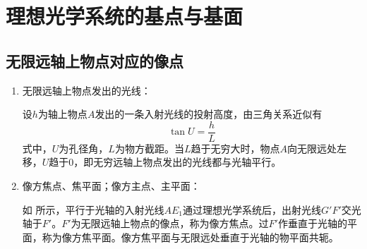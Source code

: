 \documentclass[cn,10pt,chinesefont=founder,math=newtx,cite=super,twoside]{elegantbook}
\begin{document}
\section{理想光学系统的基点与基面}
\subsection{无限远轴上物点对应的像点}
\label{subsect:infty-object}

\begin{enumerate}	
	\item 无限远轴上物点发出的光线：
	
	设$h$为轴上物点$A$发出的一条入射光线的投射高度，由三角关系近似有
	\begin{equation}
		\tan U=\frac{h}{L}
	\end{equation}
	式中，$U$为孔径角，$L$为物方截距。当$L$趋于无穷大时，物点$A$向无限远处左移，$U$趋于$0$，即无穷远轴上物点发出的光线都与光轴平行。
	\item 像方焦点、焦平面；像方主点、主平面：
	
	如 所示，平行于光轴的入射光线$AE_1$通过理想光学系统后，出射光线$G'F'$交光轴于$F'$。$F'$为无限远轴上物点的像点，称为像方焦点。过$F'$作垂直于光轴的平面，称为像方焦平面。像方焦平面与无限远处垂直于光轴的物平面共轭。


\end{enumerate}
\end{document}
